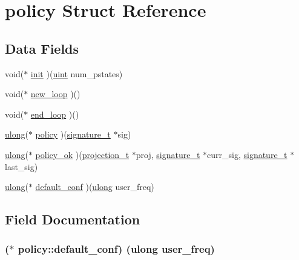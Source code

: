 \hypertarget{structpolicy}{}\section{policy Struct Reference}
\label{structpolicy}
\subsection*{Data Fields}
\begin{DoxyCompactItemize}
\item 
void($\ast$ \hyperlink{structpolicy_ade5ad6f0239e34d13826497fd72d917e}{init} )(\hyperlink{generic_8h_a91ad9478d81a7aaf2593e8d9c3d06a14}{uint} num\+\_\+pstates)
\item 
void($\ast$ \hyperlink{structpolicy_a9bb8e49f1796876238623460ff349ebf}{new\+\_\+loop} )()
\item 
void($\ast$ \hyperlink{structpolicy_a2e7ced29d27efca9a3d90ffc8fe0226e}{end\+\_\+loop} )()
\item 
\hyperlink{generic_8h_a718b4eb2652c286f4d42dc18a8e71a1a}{ulong}($\ast$ \hyperlink{structpolicy_a9c08472eff148dd22c31f1b733dfed60}{policy} )(\hyperlink{signature_8h_a3387c90f9aa9243c926866ee8ce61917}{signature\+\_\+t} $\ast$sig)
\item 
\hyperlink{generic_8h_a718b4eb2652c286f4d42dc18a8e71a1a}{ulong}($\ast$ \hyperlink{structpolicy_a5be97c21f646a597063e280cbcaec128}{policy\+\_\+ok} )(\hyperlink{projection_8h_a50fc11780fbb9af29b37d325d803a2da}{projection\+\_\+t} $\ast$proj, \hyperlink{signature_8h_a3387c90f9aa9243c926866ee8ce61917}{signature\+\_\+t} $\ast$curr\+\_\+sig, \hyperlink{signature_8h_a3387c90f9aa9243c926866ee8ce61917}{signature\+\_\+t} $\ast$last\+\_\+sig)
\item 
\hyperlink{generic_8h_a718b4eb2652c286f4d42dc18a8e71a1a}{ulong}($\ast$ \hyperlink{structpolicy_a647e41f22ae624084b0082721c013400}{default\+\_\+conf} )(\hyperlink{generic_8h_a718b4eb2652c286f4d42dc18a8e71a1a}{ulong} user\+\_\+freq)
\end{DoxyCompactItemize}


\subsection{Field Documentation}
\subsubsection[{\texorpdfstring{default\+\_\+conf}{default_conf}}]{($\ast$ policy\+::default\+\_\+conf) ({\bf ulong} user\+\_\+freq)}\hypertarget{structpolicy_a647e41f22ae624084b0082721c013400}{}\label{structpolicy_a647e41f22ae624084b0082721c013400}
